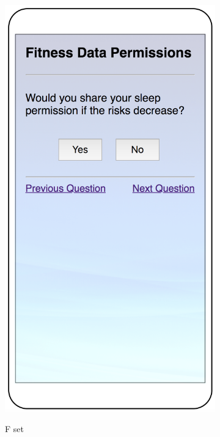 \begin{figure}
\begin{subfigure}[b]{0.24\textheight}
		\includegraphics[width=0.24\textheight]{figures/indirect2.png}
		\label{fig:indirectb}
		\caption{F set}
	\end{subfigure}
	\begin{subfigure}[b]{0.24\textheight}

\end{subfigure}
\end{figure}
